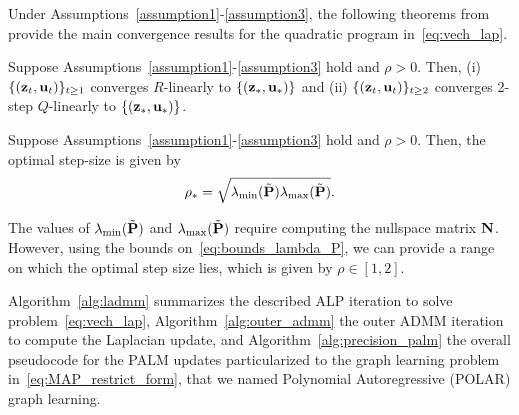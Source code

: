Under Assumptions~\ref{assumption1}-\ref{assumption3}, the following theorems from~\cite{optimal_step} provide the main convergence results for the quadratic program in~\eqref{eq:vech_lap}.

\begin{theorem}
	Suppose Assumptions~\ref{assumption1}-\ref{assumption3} hold and $\rho>0$. Then, (i) $\{(\z_t,\u_t)\}_{t\geq1}$ converges $R$-linearly to $\{(\z_\ast,\u_\ast)\}$ and (ii) $\{(\z_t,\u_t)\}_{t\geq2}$ converges 2-step $Q$-linearly to $\{(\z_\ast,\u_\ast)\}$.
\end{theorem}

\begin{theorem}
	Suppose Assumptions~\ref{assumption1}-\ref{assumption3} hold and $\rho>0$. Then, the optimal step-size is given by
	\begin{equation*}
		\rho_\ast=\sqrt{\lambda_{\min}(\tilde{\P})\lambda_{\max}(\tilde{\P})}.
	\end{equation*}	
\end{theorem}%
\noindent The values of $\lambda_{\min}(\tilde{\P})$ and $\lambda_{\max}(\tilde{\P})$ require computing the nullspace matrix $\N$. However, using the bounds on~\eqref{eq:bounds_lambda_P}, we can provide a range on which the optimal step size lies, which is given by $\rho\in[1,2]$.

Algorithm~\ref{alg:ladmm} summarizes the described ALP iteration to solve problem~\eqref{eq:vech_lap}, Algorithm~\ref{alg:outer_admm} the outer ADMM iteration to compute the Laplacian update, and Algorithm~\ref{alg:precision_palm} the overall pseudocode for the PALM updates particularized to the graph learning problem in~\eqref{eq:MAP_restrict_form}, that we named Polynomial Autoregressive (POLAR) graph learning.




